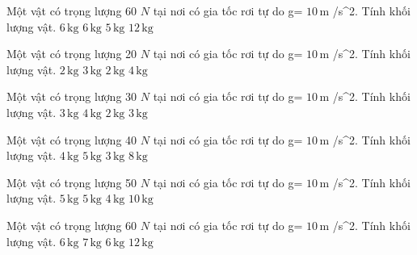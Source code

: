 \begin{ex}
Một vật có trọng lượng 60 $N$ tại nơi có gia tốc rơi tự do g= $10\,\text{m}$ /s^2. Tính khối lượng vật.
\choice
{$6\,\text{kg}$}
{\True $6\,\text{kg}$}
{$5\,\text{kg}$}
{$12\,\text{kg}$}
\end{ex}

\begin{ex}
Một vật có trọng lượng 20 $N$ tại nơi có gia tốc rơi tự do g= $10\,\text{m}$ /s^2. Tính khối lượng vật.
\choice
{$2\,\text{kg}$}
{$3\,\text{kg}$}
{\True $2\,\text{kg}$}
{$4\,\text{kg}$}
\end{ex}

\begin{ex}
Một vật có trọng lượng 30 $N$ tại nơi có gia tốc rơi tự do g= $10\,\text{m}$ /s^2. Tính khối lượng vật.
\choice
{$3\,\text{kg}$}
{$4\,\text{kg}$}
{$2\,\text{kg}$}
{\True $3\,\text{kg}$}
\end{ex}

\begin{ex}
Một vật có trọng lượng 40 $N$ tại nơi có gia tốc rơi tự do g= $10\,\text{m}$ /s^2. Tính khối lượng vật.
\choice
{\True $4\,\text{kg}$}
{$5\,\text{kg}$}
{$3\,\text{kg}$}
{$8\,\text{kg}$}
\end{ex}

\begin{ex}
Một vật có trọng lượng 50 $N$ tại nơi có gia tốc rơi tự do g= $10\,\text{m}$ /s^2. Tính khối lượng vật.
\choice
{$5\,\text{kg}$}
{\True $5\,\text{kg}$}
{$4\,\text{kg}$}
{$10\,\text{kg}$}
\end{ex}

\begin{ex}
Một vật có trọng lượng 60 $N$ tại nơi có gia tốc rơi tự do g= $10\,\text{m}$ /s^2. Tính khối lượng vật.
\choice
{$6\,\text{kg}$}
{$7\,\text{kg}$}
{\True $6\,\text{kg}$}
{$12\,\text{kg}$}
\end{ex}

